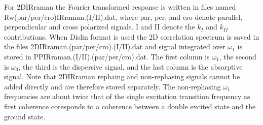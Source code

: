 For 2DIRraman the Fourier transformed response is written in files named\\ Rw(par/per/cro)IRraman.(I/II).dat, where par, per, and cro denote parallel, perpendicular and cross polarized signals. I and II denote the $k_I$ and $k_{II}$ contributions. When Dislin format is used the 2D correlation spectrum is saved in the files 2DIRraman.(par/per/cro).(I/II).dat and signal integrated over $\omega_1$ is stored in PPIRraman.(I/II).(par/per/cro).dat.                  
The first column is $\omega_1$, the second is $\omega_3$, the third is the dispersive signal, and the last column is the absorptive signal. Note that 2DIRraman rephaing and non-rephasing signals cannot be added directly and are therefore stored separately. The non-rephasing $\omega_1$ frequencies are about twice that of the single excitation transition frequency as first coherence coresponds to a coherence between a double excited state and the ground state.
